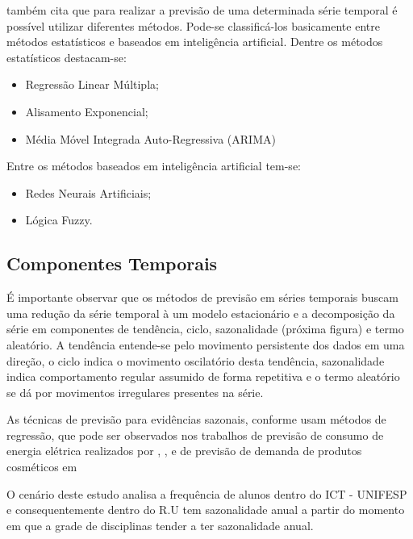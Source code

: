 \documentclass[	12pt, Times, openright, twoside, a4paper, english, brazil]{abntex2}
\begin{document}
          \cite{Almeida2013} também cita que para realizar a previsão de uma determinada série temporal é possível utilizar diferentes métodos. Pode-se classificá-los basicamente entre métodos estatísticos e baseados em inteligência artificial.
          Dentre os métodos estatísticos destacam-se:
          \begin{itemize}
          \item Regressão Linear Múltipla;
          \item Alisamento Exponencial;
          \item Média Móvel Integrada Auto-Regressiva (ARIMA)
          \end{itemize}
          Entre os métodos baseados em inteligência artificial tem-se:
          \begin{itemize}
          \item Redes Neurais Artificiais;
          \item Lógica Fuzzy.
          \end{itemize}

        \subsection{Componentes Temporais}

          É importante observar que os métodos de previsão em séries temporais buscam uma redução da série temporal à um modelo estacionário e a decomposição da série em componentes de tendência, ciclo, sazonalidade (próxima figura) e termo aleatório. A tendência entende-se pelo movimento persistente dos dados em uma direção, o ciclo indica o movimento oscilatório desta tendência, sazonalidade indica comportamento regular assumido de forma repetitiva e o termo aleatório se dá por movimentos irregulares presentes na série.
           
          As técnicas de previsão para evidências sazonais, conforme  usam métodos de regressão, que pode ser observados nos trabalhos de previsão de consumo de energia elétrica realizados por \cite{Almeida2013}, \cite{RUAS2012}, \cite{Silva2010} e de previsão de demanda de produtos cosméticos em \cite{Junior2007}

          O cenário deste estudo analisa a frequência de alunos dentro do ICT - UNIFESP e consequentemente dentro do R.U tem sazonalidade anual a partir do momento em que a grade de disciplinas tender a ter sazonalidade anual. \\
\end{document}
